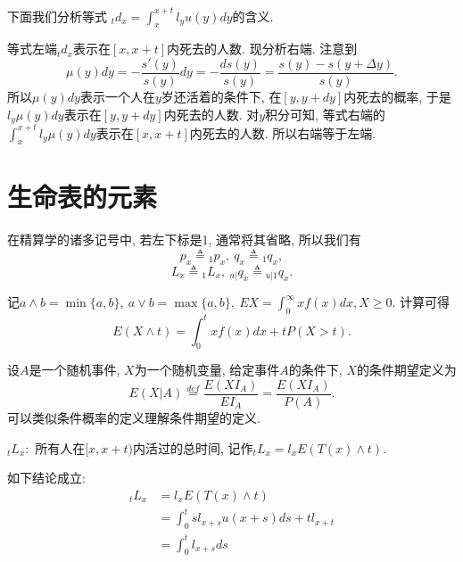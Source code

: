 \documentclass[lang=cn,10pt]{elegantbook}
\begin{document}
\begin{remark} 下面我们分析等式
	${}_td_x=\int_x^{x+t} l_yu(y)dy$的含义.
	
	等式左端${}_td_x$表示在$[x,x+t]$内死去的人数. 现分析右端. 注意到$$\mu(y)dy=-\dfrac{s'(y)}{s(y)}dy=-\dfrac{ds(y)}{s(y)}=\dfrac{s(y)-s(y+\Delta y)}{s(y)}.$$ 所以$\mu(y)dy$表示一个人在$y$岁还活着的条件下, 在$[y,y+dy]$内死去的概率, 于是$l_y\mu(y)dy$表示在$[y,y+dy]$内死去的人数. 对$y$积分可知, 等式右端的$\int_x^{x+t}l_y\mu(y)dy$表示在$[x,x+t]$内死去的人数. 所以右端等于左端.
\end{remark}

\section{生命表的元素}
\begin{proposition}
	在精算学的诸多记号中, 若左下标是1, 通常将其省略, 所以我们有
$${p_x}\triangleq{}_1p_x,~{q_x}\triangleq{}_1q_x,$$
$$L_x\triangleq{}_1L_x,~{}_{u|}q_x\triangleq{}_{u|1}q_x.$$
\end{proposition}

\begin{proposition}
	记$a\wedge b=\min\{a,b\},\ a\vee b=\max\{a,b\},\ EX=\int_0^{\infty}xf(x)dx,X\ge0.$ 计算可得
	\begin{equation*}
		E(X\wedge t) = \int_0^txf(x)dx+tP(X>t).
	\end{equation*}
\end{proposition}

\begin{definition}[条件数学期望]
	设$A$是一个随机事件, $X$为一个随机变量, 给定事件$A$的条件下, $X$的条件期望定义为
$$E(X|A)\overset{def}{=}\frac{E(XI_A)}{EI_A}=\frac{E(XI_A)}{P(A)}.$$
可以类似条件概率的定义理解条件期望的定义.
\end{definition}

\begin{definition}
	${}_tL_x:$ 所有人在$[x,x+t)$内活过的总时间, 记作$ {}_tL_x=l_xE(T(x)\wedge t).$
\end{definition}

\begin{corollary} 如下结论成立:
    \begin{align*}
        {}_tL_x & =l_xE(T(x)\wedge t)                 \\
                & =\int_0^t sl_{x+s}u(x+s)ds+tl_{x+t} \\
                & =\int_0^tl_{x+s}ds
    \end{align*}
\end{corollary}
\end{document}
